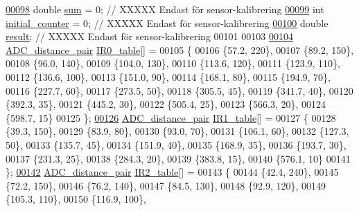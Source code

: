 \begin{DoxyCode}
\hypertarget{sensor_8h_source.tex_l00098}{}\hyperlink{sensor_8h_a2943e5895f5488ed44ed4a86e59dcf1b}{00098} \textcolor{keywordtype}{double} \hyperlink{sensor_8h_a2943e5895f5488ed44ed4a86e59dcf1b}{sum} = 0;                  \textcolor{comment}{// XXXXX Endast för sensor-kalibrering}
\hypertarget{sensor_8h_source.tex_l00099}{}\hyperlink{sensor_8h_ae93891ebfd341a8e6528beb03dc590ab}{00099} \textcolor{keywordtype}{int} \hyperlink{sensor_8h_ae93891ebfd341a8e6528beb03dc590ab}{initial\_counter} = 0;     \textcolor{comment}{// XXXXX Endast för sensor-kalibrering}
\hypertarget{sensor_8h_source.tex_l00100}{}\hyperlink{sensor_8h_a4c9d9cb8bb9d2b707a152051408f40e5}{00100} \textcolor{keywordtype}{double} \hyperlink{sensor_8h_a4c9d9cb8bb9d2b707a152051408f40e5}{result};                    \textcolor{comment}{// XXXXX Endast för sensor-kalibrering}
00101 
00103 
\hypertarget{sensor_8h_source.tex_l00104}{}\hyperlink{sensor_8h_aea6f77b6de5d03286eddec97260b58d1}{00104} \hyperlink{struct_a_d_c__distance__pair}{ADC\_distance\_pair} \hyperlink{sensor_8h_aea6f77b6de5d03286eddec97260b58d1}{IR0\_table}[] =
00105 \{
00106     \{57.2, 220\},
00107     \{89.2, 150\},
00108     \{96.0, 140\},
00109     \{104.0, 130\},
00110     \{113.6, 120\},
00111     \{123.9, 110\},
00112     \{136.6, 100\},
00113     \{151.0, 90\},
00114     \{168.1, 80\},
00115     \{194.9, 70\},
00116     \{227.7, 60\},
00117     \{273.5, 50\},
00118     \{305.5, 45\},
00119     \{341.7, 40\},
00120     \{392.3, 35\},
00121     \{445.2, 30\},
00122     \{505.4, 25\},
00123     \{566.3, 20\},
00124     \{598.7, 15\}
00125 \}; 
\hypertarget{sensor_8h_source.tex_l00126}{}\hyperlink{sensor_8h_a8339fe4dbbee2308a5f1b0a2d813e1d5}{00126} \hyperlink{struct_a_d_c__distance__pair}{ADC\_distance\_pair} \hyperlink{sensor_8h_a8339fe4dbbee2308a5f1b0a2d813e1d5}{IR1\_table}[] =
00127 \{
00128     \{39.3, 150\},
00129     \{83.9, 80\},
00130     \{93.0, 70\},
00131     \{106.1, 60\},
00132     \{127.3, 50\},
00133     \{135.7, 45\},
00134     \{151.9, 40\},
00135     \{168.9, 35\},
00136     \{193.7, 30\},
00137     \{231.3, 25\},
00138     \{284.3, 20\},
00139     \{383.8, 15\},
00140     \{576.1, 10\}
00141 \};  
\hypertarget{sensor_8h_source.tex_l00142}{}\hyperlink{sensor_8h_a8d3372b9f99cdb0224731c68b95f831e}{00142} \hyperlink{struct_a_d_c__distance__pair}{ADC\_distance\_pair} \hyperlink{sensor_8h_a8d3372b9f99cdb0224731c68b95f831e}{IR2\_table}[] =
00143 \{
00144     \{42.4, 240\},
00145     \{72.2, 150\},
00146     \{76.2, 140\},
00147     \{84.5, 130\},
00148     \{92.9, 120\},
00149     \{105.3, 110\},
00150     \{116.9, 100\},

\end{DoxyCode}
